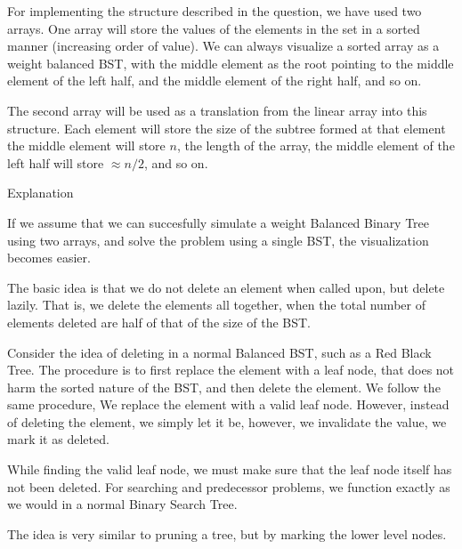 \documentclass{article}
\begin{document}
\makeheader%

\begin{question}

    For implementing the structure described in the question, we have used two arrays. One array will store the values of the elements in the set in a sorted manner (increasing order of value). We can always visualize a sorted array as a weight balanced BST, with the middle element as the root pointing to the middle element of the left half, and the middle element of the right half, and so on. \br%

    The second array will be used as a translation from the linear array into this structure. Each element will store the size of the subtree formed at that element  the middle element will store $n$, the length of the array, the middle element of the left half will store $\approx n/2$, and so on.

    \begin{qsubsection}{Explanation}

        If we assume that we can succesfully simulate a weight Balanced Binary Tree using two arrays, and solve the problem using a single BST, the visualization becomes easier. \br%

        The basic idea is that we do not delete an element when called upon, but delete lazily. That is, we delete the elements all together, when the total number of elements deleted are half of that of the size of the BST. \br%

        Consider the idea of deleting in a normal Balanced BST, such as a Red Black Tree. The procedure is to first replace the element with a leaf node, that does not harm the sorted nature of the BST, and then delete the element. We follow the same procedure,  We replace the element with a valid leaf node. However, instead of deleting the element, we simply let it be, however, we invalidate the value,  we mark it as deleted. \br%


        While finding the valid leaf node, we must make sure that the leaf node itself has not been deleted. For searching and predecessor problems, we function exactly as we would in a normal Binary Search Tree. \br%

        The idea is very similar to pruning a tree, but by marking the lower level nodes.


\end{qsubsection}
\end{question}
\end{document}
